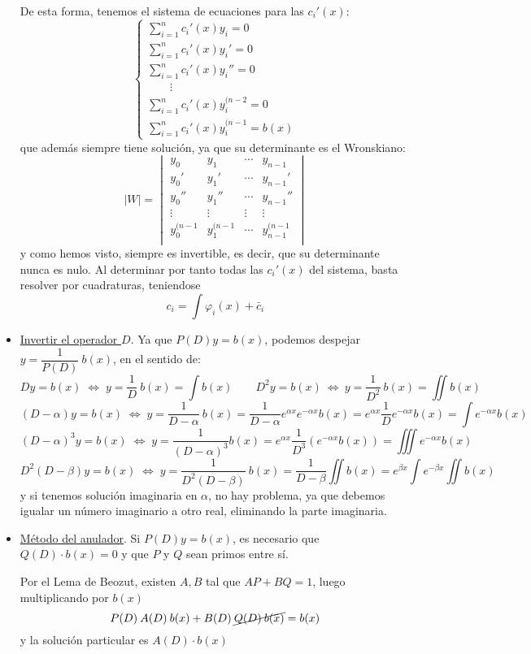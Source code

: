 \begin{itemize}
    De esta forma, tenemos el sistema de ecuaciones para las $c_i'(x)$:
    $$\displaystyle \left\{ \begin{array}{l}
         \displaystyle \sum_{i=1}^n c_i'(x) y_i  = 0  \\
         \displaystyle \sum_{i=1}^n c_i'(x) y_i'  = 0 \\
         \displaystyle \sum_{i=1}^n c_i'(x) y_i''  = 0 \\
         \qquad \vdots \\
         \displaystyle \sum_{i=1}^n c_i'(x) y_i^{(n-2}  = 0 \\
         \displaystyle \sum_{i=1}^n c_i'(x) y_i^{(n-1}  = b(x)
    \end{array} \right.$$
    que además siempre tiene solución, ya que su determinante es el Wronskiano:
    $$|W|=\begin{vmatrix}
        y_0 & y_1 & \cdots & y_{n-1} \\
        y_0' & y_1' & \cdots & y_{n-1}' \\
        y_0'' & y_1'' & \cdots & y_{n-1}'' \\
        \vdots & \vdots & \vdots & \vdots \\
        y_0^{(n-1} & y_1^{(n-1} & \cdots & y_{n-1}^{(n-1} \\
    \end{vmatrix}$$
    y como hemos visto, siempre es invertible, es decir, que su determinante nunca es nulo. Al determinar por tanto todas las $c_i'(x)$ del sistema, basta resolver por cuadraturas, teniendose
    $$c_i=\int \varphi_i(x) + \bar{c}_i$$
    
    \item \underline{Invertir el operador $D$}. Ya que $P(D)y=b(x)$, podemos despejar $y=\dfrac{1}{P(D)} \: b(x)$, en el sentido de:
    $$Dy=b(x) \; \iff \; y=\dfrac{1}{D} \: b(x)=\int b(x) \qquad D^2y=b(x) \: \iff \: y=\dfrac{1}{D^2} \: b(x)=\iint b(x) $$
    \vspace{-5mm}
    $$(D- \alpha)y=b(x) \; \iff \; y=\dfrac{1}{D-\alpha} \: b(x)=\dfrac{1}{D-\alpha} e^{\alpha x}e^{-\alpha x}b(x)=e^{\alpha x} \dfrac{1}{D} e^{-\alpha x} b(x)=\int e^{-\alpha x}b(x)$$
    \vspace{-5mm}
    $$(D-\alpha)^3y=b(x) \; \iff \; y=\dfrac{1}{(D-\alpha)^3} b(x)=e^{\alpha x} \dfrac{1}{D^3}(e^{-\alpha x}b(x))=\iiint e^{-\alpha x} b(x)$$
    \vspace{-5mm}    
    $$D^2(D-\beta)y=b(x) \; \iff \; y=\dfrac{1}{D^2(D-\beta)} \: b(x)=\dfrac{1}{D-\beta} \iint b(x)=e^{\beta x}\int e^{-\beta x} \iint b(x) $$
    y si tenemos solución imaginaria en $\alpha$, no hay problema, ya que debemos igualar un número imaginario a otro real, eliminando la parte imaginaria.
    \item \underline{Método del anulador}. Si $P(D)y=b(x)$, es necesario que $Q(D) \cdot b(x)=0$ y que $P$ y $Q$ sean primos entre sí.

    Por el Lema de Beozut, existen $A, B$ tal que $AP+BQ=1$, luego multiplicando por $b(x)$
    $$P(D) \: A(D) \: b(x)+ B(D) \: \cancel{Q(D) \: b(x)}=b(x)$$
    y la solución particular es $A(D) \cdot b(x)$
\end{itemize}
